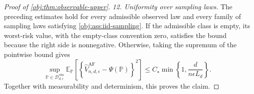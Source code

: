 \documentclass[11pt]{article}
\begin{document}
\begin{proof}[Proof of \cref{obj:thm:observable-upper}]
\textit{12. Uniformity over sampling laws.}
The preceding estimates hold for every admissible observed law and every family of sampling laws satisfying \cref{obj:ass:iid-sampling}. If the admissible class is empty, its worst-risk value, with the empty-class convention zero, satisfies the bound because the right side is nonnegative. Otherwise, taking the supremum of the pointwise bound gives
\[
\sup_{\mathbb P\in\mathcal D_{d,\epsilon}^{\mathrm{obs}}}
\mathbb E_{\mathbb P}
\left[
\left\{
\widehat V_{n,d,\epsilon}^{\mathrm{AF}}-\Psi(\mathbb P)
\right\}^{2}
\right]
\le
C_\star\min\left\{1,\frac{d}{n\epsilon L_d}\right\}.
\]
Together with measurability and determinism, this proves the claim.
\end{proof}
\end{document}
